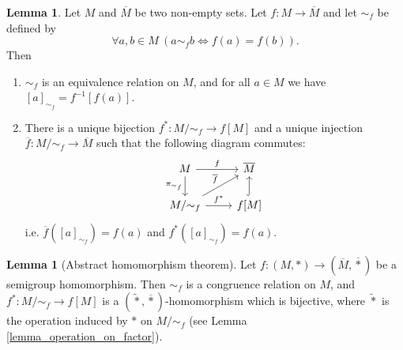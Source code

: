 \documentclass[12pt,a4paper]{report}
\theoremstyle{definition}
\newtheorem{lemma}[theorem]{Lemma}
\theoremstyle{num.custom-title}
\newcommand{\ol}{\overline}
\renewcommand{\iff}{\Leftrightarrow}
\begin{document}
\begin{lemma}
Let $M$ and $\ol{M}$ be two non-empty sets. Let $f: M \to \ol{M}$ and let $\sim_f$ be defined by
\[
\forall a,b \in M \ (a \sim_f b \iff f(a) = f(b)).
\]
Then
\begin{enumerate}
\item $\sim_f$ is an equivalence relation on $M$, and for all $a \in M$ we have $[a]_{\sim_f} = f^{-1}[f(a)]$.
\item There is a unique bijection $f^* : M/{\sim_f} \to f[M]$ and a unique injection $\ol{f}: M/{\sim_f} \to \ol{M}$ such that the following diagram commutes:
\[
\begin{tikzcd}
M \arrow{r}{f} \arrow[swap]{d}{\pi_{\sim_f}} & \ol{M} \\
M/{\sim_f} \arrow{ur}{\ol{f}} \arrow{r}{f^*} & f[M] \arrow[hookrightarrow]{u}{}
\end{tikzcd}
\]
i.e. $\ol{f}([a]_{\sim_f}) = f(a)$ and $f^*([a]_{\sim_f})=f(a)$.
\end{enumerate}
\end{lemma}

\begin{lemma}[Abstract homomorphism theorem]
Let $f: (M,*) \to (\ol{M},\ol{*})$ be a semigroup homomorphism. Then $\sim_f$ is a congruence relation on $M$, and $f^* \colon M/{\sim_f} \to f[M]$ is a $(\tilde{*}, \ol{*})$-homomorphism which is bijective, where $\tilde{*}$ is the operation induced by $*$ on $M/{\sim_f}$ (see Lemma \ref{lemma_operation_on_factor}).
\end{lemma}
\end{document}
